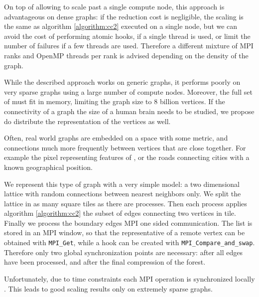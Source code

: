 On top of allowing to scale past a single compute node, this approach is advantageous on
dense graphs: if the reduction cost is negligible, the scaling is the same as algorithm
\ref{algorithm:cc2} executed on a single node,
but we can avoid the cost of performing atomic hooks, if a single thread is used, or limit the
number of failures if a few threads are used.
Therefore a different mixture of MPI ranks and OpenMP threads per rank is advised depending on the
density of the graph.

While the described approach works on generic graphs, it performs poorly on very sparse graphs using
a large number of compute nodes. Moreover, the full set of  must fit in memory, limiting
the graph size to $8$ billion vertices. If the connectivity of a graph the size of a human brain needs
to be studied,
we propose do distribute the representation of the vertices as well.

Often, real world graphs are embedded on a space with some metric, and connections  much
more frequently between
vertices that are close together. For example the pixel representing features of , or the
roads connecting cities
with a known geographical position.

We represent this type of graph with a very simple model: a two dimensional lattice with random
connections between nearest neighbors
only. We split the lattice in as many square tiles as there are processes. Then each process
applies algorithm \ref{algorithm:cc2}  the subset
of edges connecting two vertices in  tile. Finally we process the boundary edges  MPI
one sided communication. The list  is stored in an MPI window, so that
the representative of a remote vertex
can be obtained with \verb|MPI_Get|, while a hook can be created with \verb|MPI_Compare_and_swap|.
Therefore only two global synchronization points are necessary: after all edges have been
processed, and after the final compression
of the forest.

Unfortunately, due to time constraints  each MPI operation is
synchronized locally .
This leads to good scaling results only on extremely sparse graphs. %

